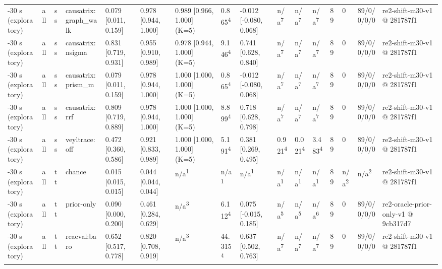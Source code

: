 \begin{table}[t]
\begin{tabular}{llllllllllllllll}
-30 s (exploratory) & all & ss & causatrix:graph\_walk & 0.079 [0.011, 0.159] & 0.978 [0.944, 1.000] & 0.989 [0.966, 1.000] (K=5) & 0.865\textsuperscript{4} & -0.012 [-0.080, 0.068] & n/a\textsuperscript{7} & n/a\textsuperscript{7} & n/a\textsuperscript{7} & 89 & 0 & 89/0/0/0/0 & re2-shift-m30-v1 @ 281787f1 \\
-30 s (exploratory) & all & ss & causatrix:nsigma & 0.831 [0.719, 0.931] & 0.955 [0.910, 0.989] & 0.978 [0.944, 1.000] (K=5) & 9.146\textsuperscript{4} & 0.741 [0.628, 0.840] & n/a\textsuperscript{7} & n/a\textsuperscript{7} & n/a\textsuperscript{7} & 89 & 0 & 89/0/0/0/0 & re2-shift-m30-v1 @ 281787f1 \\
-30 s (exploratory) & all & ss & causatrix:prism\_m & 0.079 [0.011, 0.159] & 0.978 [0.944, 1.000] & 1.000 [1.000, 1.000] (K=5) & 0.865\textsuperscript{4} & -0.012 [-0.080, 0.068] & n/a\textsuperscript{7} & n/a\textsuperscript{7} & n/a\textsuperscript{7} & 89 & 0 & 89/0/0/0/0 & re2-shift-m30-v1 @ 281787f1 \\
-30 s (exploratory) & all & ss & causatrix:rrf & 0.809 [0.719, 0.889] & 0.978 [0.944, 1.000] & 1.000 [1.000, 1.000] (K=5) & 8.899\textsuperscript{4} & 0.718 [0.628, 0.798] & n/a\textsuperscript{7} & n/a\textsuperscript{7} & n/a\textsuperscript{7} & 89 & 0 & 89/0/0/0/0 & re2-shift-m30-v1 @ 281787f1 \\
-30 s (exploratory) & all & ss & veyltrace:off & 0.472 [0.360, 0.586] & 0.921 [0.833, 0.989] & 1.000 [1.000, 1.000] (K=5) & 5.191\textsuperscript{4} & 0.381 [0.269, 0.495] & 0.921\textsuperscript{4} & 0.021\textsuperscript{4} & 3.483\textsuperscript{4} & 89 & 0 & 89/0/0/0/0 & re2-shift-m30-v1 @ 281787f1 \\
-30 s (exploratory) & all & tt & chance & 0.015 [0.015, 0.015] & 0.044 [0.044, 0.044] & n/a\textsuperscript{1} & n/a\textsuperscript{1} & n/a\textsuperscript{1} & n/a\textsuperscript{1} & n/a\textsuperscript{1} & n/a\textsuperscript{1} & 89 & n/a\textsuperscript{2} & n/a\textsuperscript{2} & re2-shift-m30-v1 @ 281787f1 \\
-30 s (exploratory) & all & tt & prior-only & 0.090 [0.000, 0.200] & 0.461 [0.284, 0.629] & n/a\textsuperscript{3} & 6.112\textsuperscript{4} & 0.075 [-0.015, 0.185] & n/a\textsuperscript{5} & n/a\textsuperscript{5} & n/a\textsuperscript{6} & 89 & 0 & 89/0/0/0/0 & re2-oracle-prior-only-v1 @ 9cb317d7 \\
-30 s (exploratory) & all & tt & rcaeval:baro & 0.652 [0.517, 0.778] & 0.820 [0.708, 0.919] & n/a\textsuperscript{3} & 44.315\textsuperscript{4} & 0.637 [0.502, 0.763] & n/a\textsuperscript{7} & n/a\textsuperscript{7} & n/a\textsuperscript{7} & 89 & 0 & 89/0/0/0/0 & re2-shift-m30-v1 @ 281787f1 \\

\end{tabular}
\end{table}
